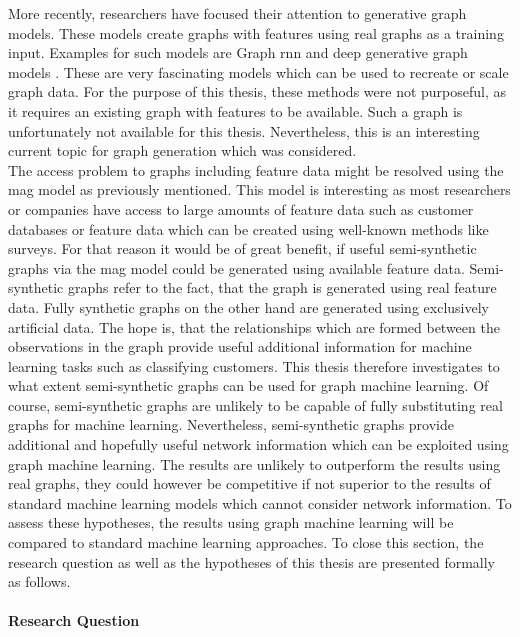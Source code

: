 	\noindent More recently, researchers have focused their attention to
	generative graph models. These models create graphs with features using
	real graphs as a training input. Examples for such models are Graph
	\ac{rnn} \citep{you2018graphrnn} and deep generative graph
	models \citep{li2018learning}. These are very fascinating models which can
	be used to recreate or scale graph data. For the purpose of this thesis,
	these methods were not purposeful, as it requires an existing graph with
	features to be available. Such a graph is unfortunately not available for
	this thesis. Nevertheless, this is an interesting current topic for graph 
	generation which was considered. \\ 

	\noindent The access problem to graphs including feature data might be resolved
	using the \ac{mag} model as previously mentioned. This model is interesting as 
	most researchers or companies have access to large amounts of feature data 
	such as customer databases or feature data which can be created using 
	well-known methods like surveys. For that reason it would be of great
	benefit, if useful semi-synthetic graphs via the \ac{mag} model could be
	generated using available feature data. Semi-synthetic graphs refer to the 
	fact, that the graph is generated using real feature data. Fully synthetic 
	graphs on the other hand are generated using exclusively artificial data. 
	The hope is, that the relationships which are formed between the 
	observations in the graph provide useful additional information for machine 
	learning tasks such as classifying customers. This thesis therefore
	investigates to what extent semi-synthetic graphs can be used for graph
	machine learning. Of course, semi-synthetic graphs are unlikely to be
	capable of fully substituting real graphs for machine learning.
	Nevertheless, semi-synthetic graphs provide additional and hopefully useful
	network information which can be exploited using graph machine learning.
	The results are unlikely to outperform the results using real graphs, they
	could however be competitive if not superior to the results of standard 
	machine learning models which cannot consider network information. To assess 
	these hypotheses, the results using graph machine learning will be 
	compared to standard machine learning approaches. To close this section, 
	the research question as well as the hypotheses of this thesis are 
	presented formally as follows. 

	\paragraph{Research Question}\mbox{}

